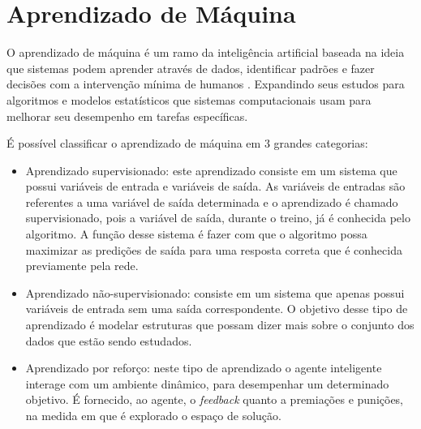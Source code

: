 \section{Aprendizado de Máquina}

O aprendizado de máquina é um ramo da inteligência artificial baseada na ideia que sistemas podem aprender através de dados, identificar padrões e fazer decisões com a intervenção mínima de humanos \cite{mitchell1990machine}. Expandindo seus estudos para algoritmos e modelos estatísticos que sistemas computacionais usam para melhorar seu desempenho em tarefas específicas.

É possível classificar o aprendizado de máquina em 3 grandes categorias:
\begin{itemize}
    \item Aprendizado supervisionado: este aprendizado consiste em um sistema que possui variáveis de entrada e variáveis de saída. As variáveis de entradas são referentes a uma variável de saída determinada e o aprendizado é chamado supervisionado, pois a variável de saída, durante o treino, já é conhecida pelo algoritmo. A função desse sistema é fazer com que o algoritmo possa maximizar as predições de saída para uma resposta correta que é conhecida previamente pela rede.
    \item Aprendizado não-supervisionado: consiste em um sistema que apenas possui variáveis de entrada sem uma saída correspondente. O objetivo desse tipo de aprendizado é modelar estruturas que possam dizer mais sobre o conjunto dos dados que estão sendo estudados.
    \item Aprendizado por reforço: neste tipo de aprendizado o agente inteligente interage com um ambiente dinâmico, para desempenhar um determinado objetivo. É fornecido, ao agente, o \textit{feedback} quanto a premiações e punições, na medida em que é explorado o espaço de solução.
\end{itemize}